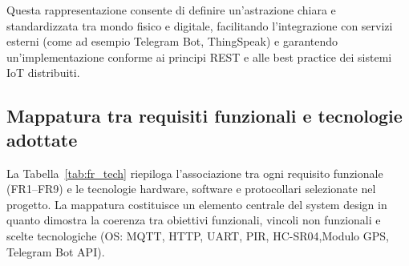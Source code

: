 Questa rappresentazione consente di definire un’astrazione chiara e standardizzata tra mondo fisico e digitale, facilitando l’integrazione con servizi esterni (come ad esempio Telegram Bot, ThingSpeak) e garantendo un’implementazione conforme ai principi REST e alle best practice dei sistemi IoT distribuiti.


\subsection{Mappatura tra requisiti funzionali e tecnologie adottate}

La Tabella~\ref{tab:fr_tech} riepiloga l'associazione tra ogni requisito funzionale (FR1--FR9)
e le tecnologie hardware, software e protocollari selezionate nel progetto.
La mappatura costituisce un elemento centrale del system design in quanto dimostra
la coerenza tra obiettivi funzionali, vincoli non funzionali e scelte tecnologiche
(OS: MQTT, HTTP, UART, PIR, HC-SR04,Modulo GPS, Telegram Bot API).

